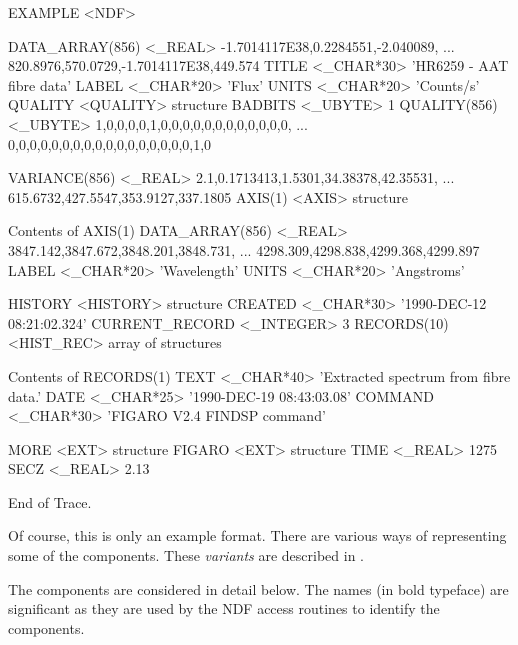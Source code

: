 \documentclass[twoside,11pt,nolof]{starlink}
\begin{document}
\begin{small}
\begin{terminalv}
EXAMPLE  <NDF>

   DATA_ARRAY(856)  <_REAL>       -1.7014117E38,0.2284551,-2.040089,
                                  ... 820.8976,570.0729,-1.7014117E38,449.574
   TITLE          <_CHAR*30>      'HR6259 - AAT fibre data'
   LABEL          <_CHAR*20>      'Flux'
   UNITS          <_CHAR*20>      'Counts/s'
   QUALITY        <QUALITY>       {structure}
      BADBITS        <_UBYTE>        1
      QUALITY(856)   <_UBYTE>        1,0,0,0,0,1,0,0,0,0,0,0,0,0,0,0,0,0,
                                     ... 0,0,0,0,0,0,0,0,0,0,0,0,0,0,0,0,0,1,0

   VARIANCE(856)  <_REAL>         2.1,0.1713413,1.5301,34.38378,42.35531,
                                  ... 615.6732,427.5547,353.9127,337.1805
   AXIS(1)        <AXIS>          {structure}

   Contents of AXIS(1)
      DATA_ARRAY(856)  <_REAL>       3847.142,3847.672,3848.201,3848.731,
                                     ... 4298.309,4298.838,4299.368,4299.897
      LABEL          <_CHAR*20>      'Wavelength'
      UNITS          <_CHAR*20>      'Angstroms'

   HISTORY        <HISTORY>       {structure}
      CREATED        <_CHAR*30>      '1990-DEC-12 08:21:02.324'
      CURRENT_RECORD  <_INTEGER>     3
      RECORDS(10)    <HIST_REC>      {array of structures}

      Contents of RECORDS(1)
         TEXT           <_CHAR*40>      'Extracted spectrum from fibre data.'
         DATE           <_CHAR*25>      '1990-DEC-19 08:43:03.08'
         COMMAND        <_CHAR*30>      'FIGARO V2.4 FINDSP command'


   MORE           <EXT>           {structure}
      FIGARO         <EXT>           {structure}
         TIME           <_REAL>         1275
         SECZ           <_REAL>         2.13

End of Trace.
\end{terminalv}
\end{small}
\newpage

Of course, this is only an example format. There are various ways of
representing some of the components.
These {\sl variants\/} are described in .

The components are considered in detail below.
The names (in bold typeface) are significant as they are used by the NDF
access routines to identify the components.
\end{document}
